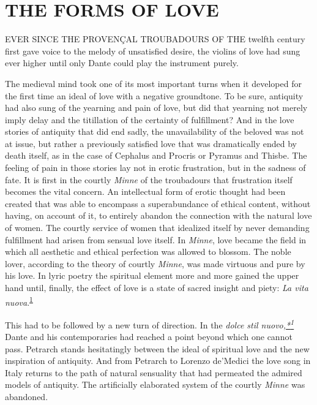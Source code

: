 \chapter{THE FORMS OF LOVE}

EVER SINCE THE PROVENÇAL TROUBADOURS OF THE twelfth century first gave
voice to the melody of unsatisfied desire, the violins of love had sung
ever higher until only Dante could play the instrument purely.

The medieval mind took one of its most important turns when it developed
for the first time an ideal of love with a negative groundtone. To be
sure, antiquity had also sung of the yearning and pain of love, but did
that yearning not merely imply delay and the titillation of the
certainty of fulfillment? And in the love stories of antiquity that did
end sadly, the unavailability of the beloved was not at issue, but
rather a previously satisfied love that was dramatically ended by death
itself, as in the case of Cephalus and Procris or Pyramus and Thisbe.
The feeling of pain in those stories lay not in erotic frustration, but
in the sadness of fate. It is first in the courtly \emph{Minne} of the
troubadours that frustration itself becomes the vital concern. An
intellectual form of erotic thought had been created that was able to
encompass a superabundance of ethical content, without having, on
account of it, to entirely abandon the connection with the natural love
of women. The courtly service of women that idealized itself by never
demanding fulfillment had arisen from sensual love itself. In
\emph{Minne}, love became the field in which all aesthetic and ethical
perfection was allowed to blossom. The noble lover, according to the
theory of courtly \emph{Minne}, was made virtuous and pure by his love.
In lyric poetry the spiritual element more and more gained the upper
hand until, finally, the effect of love is a state of sacred insight and
piety: \emph{La vita
nuova}.\textsuperscript{\protect\hypertarget{11_Chapter_Four__THE_FORMS_OF_LOVE.xhtmlux5cux23id_1486}{\protect\hyperlink{23_NOTES.xhtmlux5cux23id_1487}{1}}}

This had to be followed by a new turn of direction. In the \emph{dolce
stil
nuovo,\protect\hypertarget{11_Chapter_Four__THE_FORMS_OF_LOVE.xhtmlux5cux23id_3101}{\protect\hyperlink{23_NOTES.xhtmlux5cux23id_3102}{*\textsuperscript{1}}}}
Dante and his contemporaries had reached a point
be\protect\hypertarget{11_Chapter_Four__THE_FORMS_OF_LOVE.xhtmlux5cux23page_127}{}{}yond
which one cannot pass. Petrarch stands hesitatingly between the ideal of
spiritual love and the new inspiration of antiquity. And from Petrarch
to Lorenzo de'Medici the love song in Italy returns to the path of
natural sensuality that had permeated the admired models of antiquity.
The artificially elaborated system of the courtly \emph{Minne} was
abandoned.

